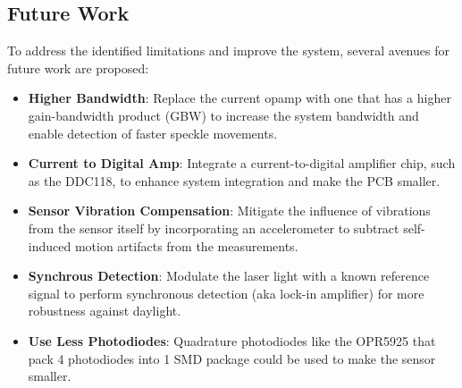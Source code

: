 \subsection{Future Work}
\label{sub:future_work}

To address the identified limitations and improve the system, several avenues for future work are proposed:

\begin{itemize}
    \item \textbf{Higher Bandwidth}: Replace the current opamp with one that has a higher gain-bandwidth product (GBW) to increase the system bandwidth and enable detection of faster speckle movements.
    \item \textbf{Current to Digital Amp}: Integrate a current-to-digital amplifier chip, such as the DDC118, to enhance system integration and make the PCB smaller.
    \item \textbf{Sensor Vibration Compensation}: Mitigate the influence of vibrations from the sensor itself by incorporating an accelerometer to subtract self-induced motion artifacts from the measurements.
    \item \textbf{Synchrous Detection}: Modulate the laser light with a known reference signal to perform synchronous detection (aka lock-in amplifier) for more robustness against daylight.
    \item \textbf{Use Less Photodiodes}: Quadrature photodiodes like the OPR5925 that pack 4 photodiodes into 1 SMD package could be used to make the sensor smaller.
\end{itemize}